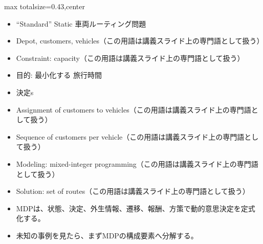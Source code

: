 \clearpage
{}
\begin{minipage}[t]{0.405\textwidth}
\begin{adjustbox}{max totalsize={\textwidth}{0.43\textheight},center}
\begin{minipage}{\textwidth}\scriptsize
{}\begin{itemize}
\item “Standard” Static 車両ルーティング問題
\item Depot, customers, vehicles（この用語は講義スライド上の専門語として扱う）
\item Constraint: capacity（この用語は講義スライド上の専門語として扱う）
\item 目的: 最小化する 旅行時間
\item 決定s
\item Assignment of customers to vehicles（この用語は講義スライド上の専門語として扱う）
\item Sequence of customers per vehicle（この用語は講義スライド上の専門語として扱う）
\item Modeling: mixed-integer programming（この用語は講義スライド上の専門語として扱う）
\item Solution: set of routes（この用語は講義スライド上の専門語として扱う）
\end{itemize}\begin{itemize}
\item MDPは、状態、決定、外生情報、遷移、報酬、方策で動的意思決定を定式化する。
\item 未知の事例を見たら、まずMDPの構成要素へ分解する。
\end{itemize}
\end{minipage}
\end{adjustbox}
\end{minipage}\hfill
